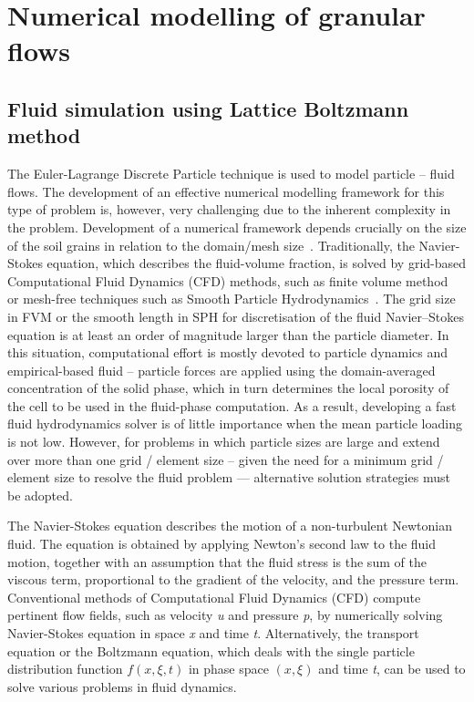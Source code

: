 \chapter{Numerical modelling of granular flows}

\ifpdf
    \graphicspath{{Chapter3/figs/raster/}{Chapter3/figs/pdf/}{Chapter3/figs/}}
\else
    \graphicspath{{Chapter3/figs/vector/}{Chapter3/figs/}}
\fi


\section{Fluid simulation using Lattice Boltzmann method}

The Euler-Lagrange Discrete Particle technique is used to model particle -- 
fluid flows. The development of an effective numerical modelling framework for 
this type of problem is, however, very challenging due to the inherent 
complexity in the problem. Development of a numerical framework depends 
crucially on the size of the soil grains in relation to the domain/mesh 
size~\citep{Feng2007}. Traditionally, the Navier-Stokes equation, which 
describes the fluid-volume fraction, is solved by grid-based Computational 
Fluid Dynamics (CFD) methods, such as finite volume 
method~\citep{Capecelatro2013} or mesh-free techniques such as Smooth Particle 
Hydrodynamics~\citep{Sun2013}. The grid size in FVM or the smooth length in SPH 
for discretisation of the fluid Navier–Stokes equation is at least an order of 
magnitude larger than the particle diameter. In this situation, computational 
effort is mostly devoted to particle dynamics and empirical-based fluid -- 
particle forces are applied using the domain-averaged concentration of the 
solid phase, which in turn determines the local porosity of the cell to be used 
in the fluid-phase computation. As a result, developing a fast fluid 
hydrodynamics solver is of little importance when the mean particle loading is 
not low.  However, for problems in which particle sizes are large and extend 
over more than one grid / element size -- given the need for a minimum grid / 
element size to resolve the fluid problem — alternative solution strategies 
must be adopted.  
 
The Navier-Stokes equation describes the motion of a non-turbulent Newtonian 
fluid. The equation is obtained by applying Newton's second law to the fluid
motion, together with an assumption that the fluid stress is the sum of the 
viscous term, proportional to the gradient of the velocity, and the pressure 
term. Conventional methods of Computational Fluid Dynamics (CFD) compute 
pertinent flow fields, such as velocity \textit{u} and pressure \textit{p}, by 
numerically solving Navier-Stokes equation in space \textit{x} and time 
\textit{t}. Alternatively, the transport equation or the Boltzmann equation, 
which deals with the single particle distribution function $f(x,\xi,t)$ in 
phase space $(x,\xi)$ and time \textit{t}, can be used to solve various 
problems in fluid dynamics. 

